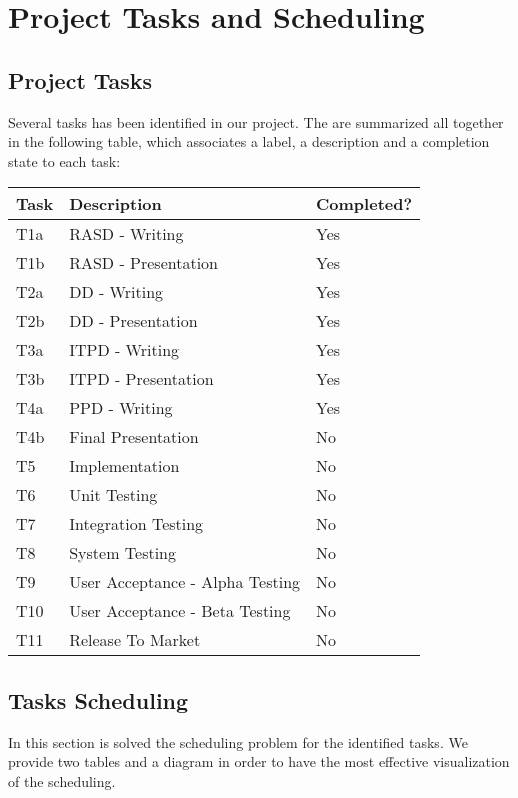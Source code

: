 \section{Project Tasks and Scheduling}
%
\subsection{Project Tasks}
Several tasks has been identified in our project.
The are summarized all together in the following table, which associates a label, a description and a completion state to each task:
\begin{center}
	\begin{tabulary}{\linewidth\tymin=70pt}{Y{2cm}|Y{6cm}|Y{2.25cm}}
		\textbf{Task} & \textbf{Description} & \textbf{Completed?}\\ \hline
		T1a & RASD - Writing & Yes \\ \hline
		T1b & RASD - Presentation & Yes \\ \hline
		T2a & DD - Writing & Yes \\ \hline
		T2b & DD - Presentation & Yes \\ \hline
		T3a & ITPD - Writing & Yes \\ \hline
		T3b & ITPD - Presentation & Yes \\ \hline
		T4a & PPD - Writing & Yes \\ \hline
		T4b & Final Presentation & No \\ \hline
		T5 & Implementation & No \\ \hline
		T6 & Unit Testing & No \\ \hline
		T7 & Integration Testing & No \\ \hline
		T8 & System Testing & No \\ \hline
		T9 & User Acceptance - Alpha Testing & No \\ \hline
		T10 & User Acceptance - Beta Testing & No \\ \hline
		T11 & Release To Market & No \\
	\end{tabulary}
\end{center}
%
\subsection{Tasks Scheduling}
In this section is solved the scheduling problem for the identified tasks.
We provide two tables and a diagram in order to have the most effective visualization of the scheduling.
%
